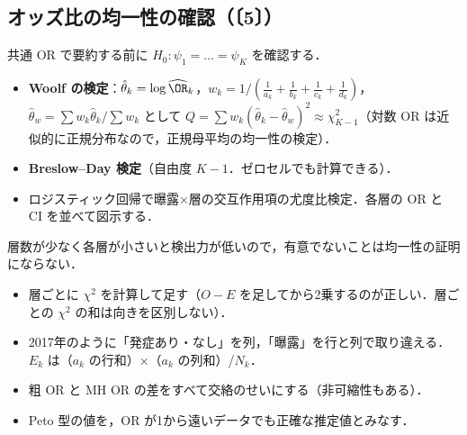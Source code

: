 \subsection{オッズ比の均一性の確認（〔5〕）}
共通 OR で要約する前に $H_0:\psi_1=\dots=\psi_K$ を確認する．
\begin{itemize}
\item \textbf{Woolf の検定}：$\hat\theta_k=\log\widehat\OR_k$，$w_k=1/(\frac1{a_k}+\frac1{b_k}+\frac1{c_k}+\frac1{d_k})$，$\hat\theta_w=\sum w_k\hat\theta_k/\sum w_k$ として
      $Q=\sum w_k(\hat\theta_k-\hat\theta_w)^2\approx\chi^2_{K-1}$（対数 OR は近似的に正規分布なので，正規母平均の均一性の検定）．
\item \textbf{Breslow--Day 検定}（自由度 $K-1$．ゼロセルでも計算できる）．
\item ロジスティック回帰で曝露×層の交互作用項の尤度比検定．各層の OR と CI を並べて図示する．
\end{itemize}
層数が少なく各層が小さいと検出力が低いので，有意でないことは均一性の証明にならない．

\begin{warnbox}
\begin{itemize}
\item 層ごとに $\chi^2$ を計算して足す（$O-E$ を足してから2乗するのが正しい．層ごとの $\chi^2$ の和は向きを区別しない）．
\item 2017年のように「発症あり・なし」を列，「曝露」を行と列で取り違える．$E_k$ は（$a_k$ の行和）×（$a_k$ の列和）/$N_k$．
\item 粗 OR と MH OR の差をすべて交絡のせいにする（非可縮性もある）．
\item Peto 型の値を，OR が1から遠いデータでも正確な推定値とみなす．
\end{itemize}
\end{warnbox}


